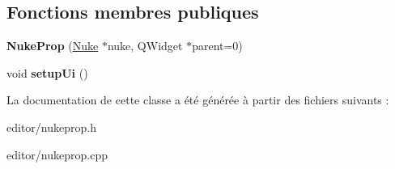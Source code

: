 \subsection*{Fonctions membres publiques}
\begin{DoxyCompactItemize}
\item 
\hypertarget{classNukeProp_a2e11beb43353c8ccbdfe1d8ba7eb61a6}{{\bfseries Nuke\+Prop} (\hyperlink{classNuke}{Nuke} $\ast$nuke, Q\+Widget $\ast$parent=0)}\label{classNukeProp_a2e11beb43353c8ccbdfe1d8ba7eb61a6}

\item 
\hypertarget{classNukeProp_a4f9fd54eecaba08172d134599908ecf9}{void {\bfseries setup\+Ui} ()}\label{classNukeProp_a4f9fd54eecaba08172d134599908ecf9}

\end{DoxyCompactItemize}


La documentation de cette classe a été générée à partir des fichiers suivants \+:\begin{DoxyCompactItemize}
\item 
editor/nukeprop.\+h\item 
editor/nukeprop.\+cpp\end{DoxyCompactItemize}
